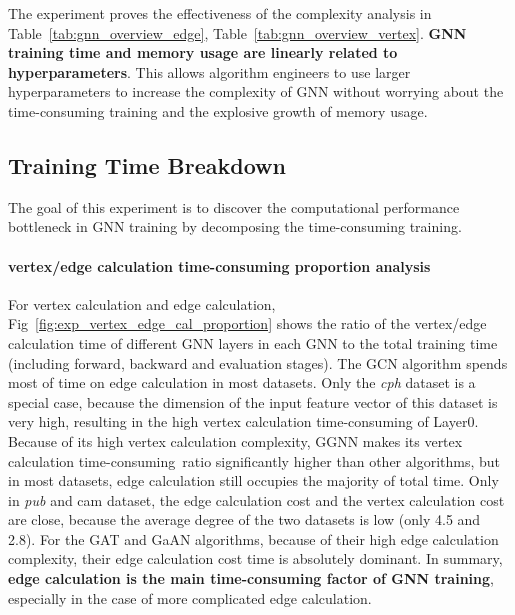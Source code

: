 The experiment proves the effectiveness of the complexity analysis in Table~\ref{tab:gnn_overview_edge}, Table~\ref{tab:gnn_overview_vertex}. \textbf{GNN training time and memory usage are linearly related to hyperparameters}.
This allows algorithm engineers to use larger hyperparameters to increase the complexity of GNN without worrying about the time-consuming training and the explosive growth of memory usage.

\subsection{Training Time Breakdown}
\label{sec:training_time_breakdown}

The goal of this experiment is to discover the computational performance bottleneck in GNN training
by decomposing the time-consuming training.

\paragraph{vertex/edge calculation time-consuming proportion analysis}

For vertex calculation and edge calculation, Fig~\ref{fig:exp_vertex_edge_cal_proportion} shows the ratio of the vertex/edge calculation time of different GNN layers in each GNN
to the total training time (including forward, backward and evaluation stages). The GCN algorithm spends most of time on edge calculation in most datasets.
Only the \textit{cph} dataset is a special case, because the dimension of the input feature vector of this dataset is very high, resulting in the 
high vertex calculation time-consuming of Layer0. Because of its high vertex calculation complexity, GGNN makes its vertex calculation time-consuming\
ratio significantly higher than other algorithms, but in most datasets, edge calculation still occupies the majority of total time. 
Only in \textit{pub} and cam dataset, the edge calculation cost and the vertex calculation cost are close, because the average degree of the two datasets is low (only 4.5 and 2.8).
For the GAT and GaAN algorithms, because of their high edge calculation complexity, their edge calculation cost time is absolutely dominant. 
In summary, \textbf{edge calculation is the main time-consuming factor of GNN training}, especially in the case of more complicated edge calculation.

